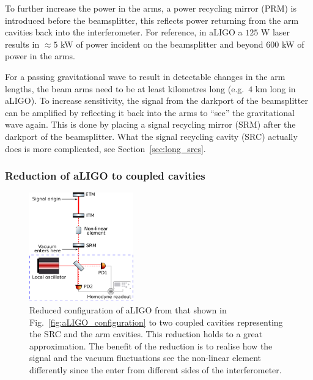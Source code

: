\documentclass[aps,pra,superscriptaddress,reprint,nofootinbib]{revtex4-1}
\begin{document}
To further increase the power in the arms, a power recycling mirror (PRM) is introduced before the beamsplitter, this reflects power returning from the arm cavities back into the interferometer. For reference, in aLIGO a $125$ W laser results in $\approx 5$ kW of power incident on the beamsplitter and beyond $600$ kW of power in the arms.


For a passing gravitational wave to result in detectable changes in the arm lengths, the beam arms need to be at least kilometres long (e.g.\ $4$ km long in aLIGO). To increase sensitivity, the signal from the darkport of the beamsplitter can be amplified by reflecting it back into the arms to ``see'' the gravitational wave again. This is done by placing a signal recycling mirror (SRM) after the darkport of the beamsplitter. What the signal recycling cavity (SRC) actually does is more complicated, see Section~\ref{sec:long_srcs}.


\subsubsection{Reduction of aLIGO to coupled cavities}

\begin{figure}[ht]
	\begin{center}
	\includegraphics[width=0.4\textwidth]{figures/aLIGO_as_coupled_cavities.pdf}
	\end{center}
	\caption{Reduced configuration of aLIGO from that shown in Fig.~\ref{fig:aLIGO_configuration} to two coupled cavities representing the SRC and the arm cavities. This reduction holds to a great approximation. The benefit of the reduction is to realise how the signal and the vacuum fluctuations see the non-linear element differently since the enter from different sides of the interferometer.}
	\label{fig:aLIGO_as_coupled_cavities}
\end{figure}
\end{document}
